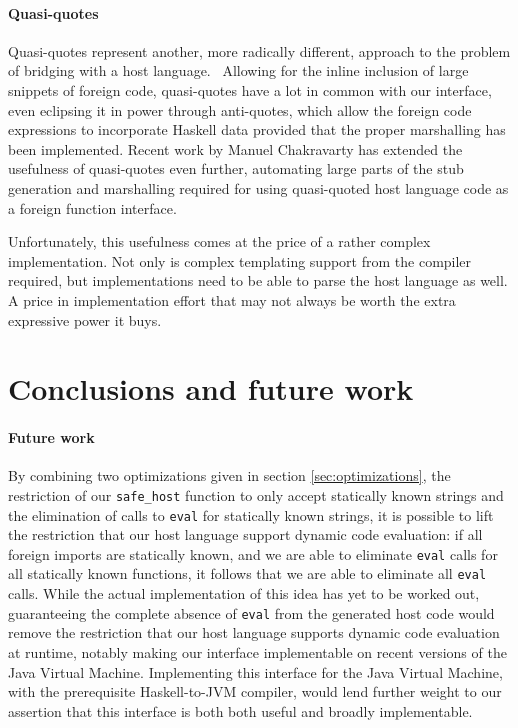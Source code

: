 \documentclass[preprint]{sigplanconf}
\begin{document}
\paragraph{Quasi-quotes}
Quasi-quotes represent another, more radically different, approach to the
problem of bridging with a host language.\ \cite{quasiquotes}
Allowing for the inline inclusion of large snippets of foreign code,
quasi-quotes have a lot in common with our interface, even eclipsing it in
power through anti-quotes, which allow the foreign code expressions to
incorporate Haskell data provided that the proper marshalling has been
implemented. Recent work by Manuel Chakravarty has extended the usefulness of
quasi-quotes even further, automating large parts of the stub generation
and marshalling required for using quasi-quoted host language code as a
foreign function interface.\ \cite{language-c-inline}

Unfortunately, this usefulness comes at the price of a rather complex
implementation. Not only is complex templating support from the compiler
required, but implementations need to be able to parse the host language as
well. A price in implementation effort that may not always be worth the extra
expressive power it buys.

\section{Conclusions and future work}
\label{sec:conclusion}
\paragraph{Future work}
By combining two optimizations given in section \ref{sec:optimizations},
the restriction of our \lstinline!safe_host! function to only accept statically
known strings and the elimination of calls to \lstinline!eval! for statically
known strings, it is possible to lift the restriction that our host language
support dynamic code evaluation: if all foreign imports are statically known,
and we are able to eliminate \lstinline!eval! calls for all statically known
functions, it follows that we are able to eliminate all \lstinline!eval!
calls.
While the actual implementation of this idea has yet to be worked out,
guaranteeing the complete absence of \lstinline!eval! from the generated host
code would remove the restriction that our host language supports dynamic code
evaluation at runtime, notably making our interface implementable on
recent versions of the Java Virtual Machine.
Implementing this interface for the Java Virtual Machine, with the
prerequisite Haskell-to-JVM compiler, would lend further weight to our
assertion that this interface is both both useful and broadly implementable.
\end{document}
